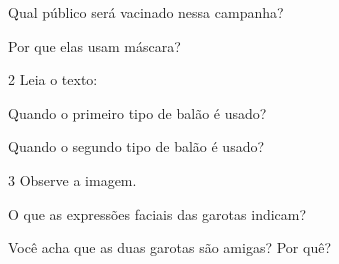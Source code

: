 \begin{escolha}
\item Qual público será vacinado nessa campanha?


\item Por que elas usam máscara?

\end{escolha}

\num{2} Leia o texto:




\begin{escolha}
\item Quando o primeiro tipo de balão é usado?


\item Quando o segundo tipo de balão é usado?

\end{escolha}

\num{3} Observe a imagem.


\begin{escolha}
\item O que as expressões faciais das garotas indicam?


\item Você acha que as duas garotas são amigas? Por quê?

\end{escolha}

